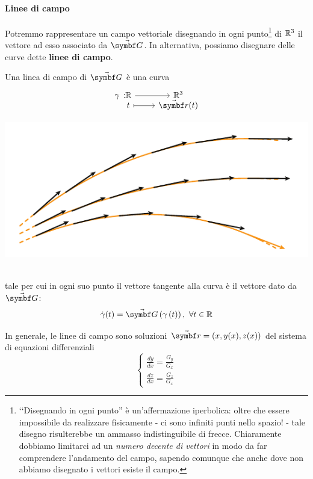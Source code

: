 \paragraph{Linee di campo}
Potremmo rappresentare un campo vettoriale disegnando in ogni punto\footnote{ ‘‘Disegnando in ogni punto'' è un'affermazione iperbolica: oltre che essere impossibile da realizzare fisicamente - ci sono infiniti punti nello spazio! - tale disegno risulterebbe un ammasso indistinguibile di frecce. Chiaramente dobbiamo limitarci ad un \textit{numero decente di vettori} in modo da far comprendere l'andamento del campo, sapendo comunque che anche dove non abbiamo disegnato i vettori esiste il campo.} di $\mathbb{R}^3$ il vettore ad esso associato da $\vba{G}$. In alternativa, possiamo disegnare delle curve dette \textbf{linee di campo}.
\begin{define}
\begin{minipage}{0.65\textwidth}
	Una linea di campo di $\vba{G}$ è una curva 
\begin{equation}
	\funztot[\gamma]{\realset}{\realset^3}{t}{\vba{r}(t)}
\end{equation}
\end{minipage}\hspace{10pt}
\begin{minipage}{0.34\textwidth}
\begin{center}
	\includegraphics[width=1\textwidth]{images/chp1/chp1lineedicampo.pdf}
\end{center}
\end{minipage}~\\
tale per cui in ogni suo punto il vettore tangente alla curva è il vettore dato da $\vba{G}$:
\begin{equation}
	\dot{\gamma}(t)=\vba{G}\left(\gamma\left(t\right)\right),\ \forall t\in\realset
\end{equation}
\end{define}
In generale, le linee di campo sono soluzioni $\vba{r}=\left(x,y(x),z(x)\right)$ del sistema di equazioni differenziali
\begin{equation}
	\begin{cases}
		\frac{dy}{dx}=\frac{G_y}{G_x}\\
		\frac{dz}{dx}=\frac{G_z}{G_x}
	\end{cases}
\end{equation}
